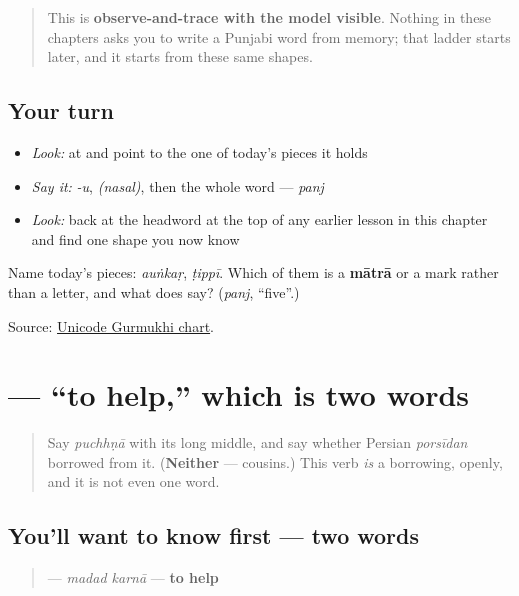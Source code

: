 \begin{quote}
This is \textbf{observe-and-trace with the model visible}. Nothing in these chapters asks you to write a Punjabi word from memory; that ladder starts later, and it starts from these same shapes.
\end{quote}

\subsection*{Your turn}
\begin{itemize}
\raggedright
  \item \emph{Look:} at \textbf{} and point to the one of today's pieces it holds
  \item \emph{Say it:} \emph{-u}, \emph{(nasal)}, then the whole word — \emph{panj}
  \item \emph{Look:} back at the headword at the top of any earlier lesson in this chapter and find one shape you now know
\end{itemize}

\begin{tcolorbox}[breakable,colback=teal!4,colframe=teal!35!black,title={Before you move on}]
Name today's pieces: \emph{auṅkaṛ}, \emph{ṭippī}. Which of them is a \textbf{mātrā} or a mark rather than a letter, and what does \textbf{} say? (\emph{panj}, “five”.)

Source: \href{https://www.unicode.org/charts/PDF/U0A00.pdf}{Unicode Gurmukhi chart}.
\end{tcolorbox}
\section[\texorpdfstring{\pa{ਮਦਦ} \pa{ਕਰਨਾ} (madad karnā)}{ਮਦਦ ਕਰਨਾ (madad karnā)}]{  — “to help,” which is two words}

\label{lesson:PA-C09-madad-karna}



\begin{quote}
Say \emph{puchhṇā} with its long middle, and say whether Persian \emph{porsīdan} borrowed from it. (\textbf{Neither} — cousins.) This verb \emph{is} a borrowing, openly, and it is not even one word.
\end{quote}

\subsection*{You'll want to know first — two words}
\begin{quote}
\textbf{ } — \emph{madad karnā} — \textbf{to help}
\end{quote}

